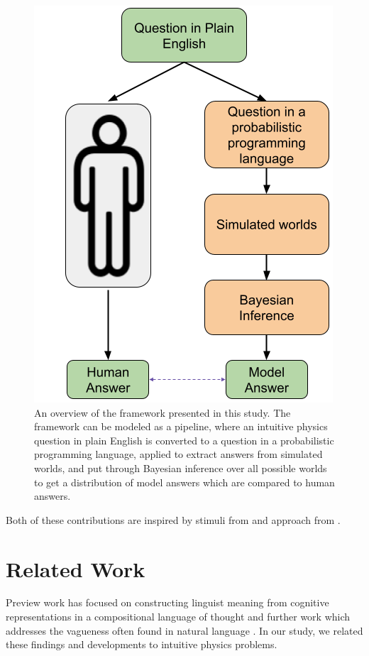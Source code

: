 \documentclass[10pt,letterpaper]{article}
\begin{document}
\begin{figure}[ht]
  \begin{center}
    \includegraphics[scale=.36]{images/966_diagram2.png}
  \end{center}
  \caption{An overview of the framework presented in this study. The framework can be modeled as a pipeline, where an intuitive physics question in plain English is converted to a question in a probabilistic programming language, applied to extract answers from simulated worlds, and put through Bayesian inference over all possible worlds to get a distribution of model answers which are compared to human answers. }
  \label{fig:workflow}
\end{figure}

Both of these contributions are inspired by stimuli from  and approach from \cite{zhang2023grounded}.

\section{Related Work}

Preview work has focused on constructing linguist meaning from cognitive representations in a compositional language of thought \cite{fodor1975language, jackendoff1985semantics} and further work which addresses the vagueness often found in natural language \cite{van2012probabilistic, cooper2015probabilistic, goodman2015probabilistic}. In our study, we related these findings and developments to intuitive physics problems.
\end{document}
